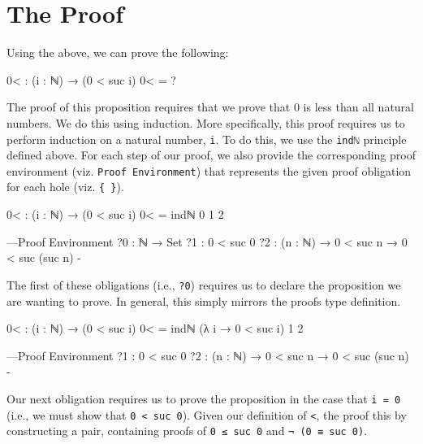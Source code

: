 \documentclass[12pt]{article}
\begin{document}
\section*{The Proof}
Using the above, we can prove the following:
\begin{code}
  0< : (i : ℕ) → (0 < suc i)
  0< = ?
\end{code}
The proof of this proposition requires that we prove that 0 is less than all
natural numbers. We do this using induction. More specifically, this proof
requires us to perform induction on a natural number, {\tt i}. To do
this, we use the {\tt indℕ} principle defined above. For each step of our proof,
we also provide the corresponding proof environment (viz. {\tt Proof Environment})
that represents the given proof obligation for each hole (viz. {\tt \{ \}}).
\begin{code}
0< : (i : ℕ) → (0 < suc i)
0< = indℕ { }0 { }1 { }2

{---Proof Environment
  ?0 : ℕ → Set
  ?1 : 0 < suc 0
  ?2 : (n : ℕ) → 0 < suc n → 0 < suc (suc n)
-}
\end{code}
The first of these obligations (i.e., {\tt ?0}) requires us to declare the
proposition we are wanting to prove. In general, this simply mirrors the proofs
type definition.
\begin{code}
0< : (i : ℕ) → (0 < suc i)
0< = indℕ (λ i → 0 < suc i) { }1 { }2

{---Proof Environment
  ?1 : 0 < suc 0
  ?2 : (n : ℕ) → 0 < suc n → 0 < suc (suc n)
-}
\end{code}
Our next obligation requires us to prove the proposition in the case that
\mbox{{\tt i = 0}} (i.e., we must show that {\tt 0 < suc 0}). Given our
definition of {\tt <}, the proof this by constructing a pair, containing proofs
of \mbox{{\tt 0 ≤ suc 0}} and \mbox{{\tt ¬ (0 ≡ suc 0)}}.
\end{document}

